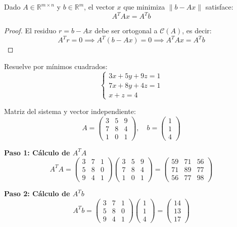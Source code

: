 \begin{theorem}
Dado $A \in \mathbb{R}^{m \times n}$ y $b \in \mathbb{R}^m$, el vector $x$ que minimiza $\|b - Ax\|$ satisface:
\[
A^T A x = A^T b
\]
\begin{proof}
El residuo $r = b - Ax$ debe ser ortogonal a $\mathcal{C}(A)$, es decir:
\[
A^T r = 0 \implies A^T(b - Ax) = 0 \implies A^T A x = A^T b
\]
\end{proof}
\end{theorem}

\begin{example}
Resuelve por mínimos cuadrados:
\[
\begin{cases}
3x + 5y + 9z = 1 \\
7x + 8y + 4z = 1 \\
x + z = 4
\end{cases}
\]
\begin{myproof}
Matriz del sistema y vector independiente:
\[
A = \begin{pmatrix}
3 & 5 & 9 \\
7 & 8 & 4 \\
1 & 0 & 1
\end{pmatrix}, \quad
b = \begin{pmatrix} 1 \\ 1 \\ 4 \end{pmatrix}
\]

\textbf{Paso 1: Cálculo de $A^T A$}
\[
A^T A = \begin{pmatrix}
3 & 7 & 1 \\
5 & 8 & 0 \\
9 & 4 & 1
\end{pmatrix}
\begin{pmatrix}
3 & 5 & 9 \\
7 & 8 & 4 \\
1 & 0 & 1
\end{pmatrix}
= \begin{pmatrix}
59 & 71 & 56 \\
71 & 89 & 77 \\
56 & 77 & 98
\end{pmatrix}
\]

\textbf{Paso 2: Cálculo de $A^T b$}
\[
A^T b = \begin{pmatrix}
3 & 7 & 1 \\
5 & 8 & 0 \\
9 & 4 & 1
\end{pmatrix}
\begin{pmatrix} 1 \\ 1 \\ 4 \end{pmatrix}
= \begin{pmatrix} 14 \\ 13 \\ 17 \end{pmatrix}
\]


\end{myproof}
\end{example}
